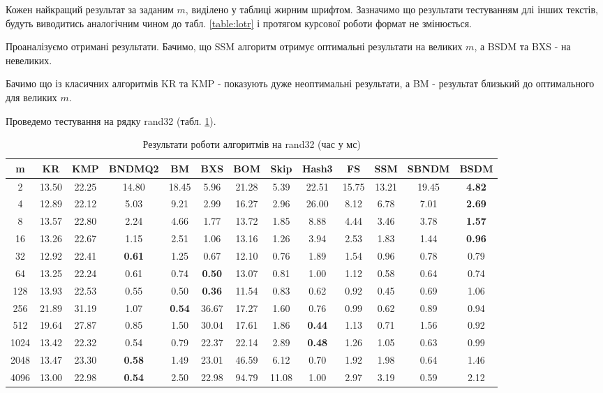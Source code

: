 \documentclass[a4paper,14pt]{extarticle} %
\begin{document}
		Кожен найкращий результат за заданим $m$, виділено у таблиці жирним шрифтом. Зазначимо що результати тестуванням длі інших текстів, будуть виводитись аналогічним чином до табл. \ref{table:lotr} і протягом курсової роботи формат не змінюється.

		Проаналізуємо отримані результати. Бачимо, що SSM алгоритм отримує оптимальні результати на великих $m$, а BSDM та BXS - на невеликих.

		Бачимо що із класичних алгоритмів KR та KMP - показують дуже неоптимальні результати, а BM - результат близький до оптимального для великих $m$.

		Проведемо тестування на рядку rand32 (табл. \ref{table:rand32}).
		\begin{table}[h]
			\centering
			\scriptsize
			\begin{tabular}{|c|c|c|c|c|c|c|c|c|c|c|c|c|}
			\hline
			\textbf{m} & \textbf{KR} & \textbf{KMP} & \textbf{BNDMQ2} & \textbf{BM} & \textbf{BXS} & \textbf{BOM} & \textbf{Skip} & \textbf{Hash3} & \textbf{FS} & \textbf{SSM} & \textbf{SBNDM} & \textbf{BSDM} \\
			\hline
			2 & 13.50 & 22.25 & 14.80 & 18.45 & 5.96 & 21.28 & 5.39 & 22.51 & 15.75 & 13.21 & 19.45 & \textbf{4.82} \\
			\hline
			4 & 12.89 & 22.12 & 5.03 & 9.21 & 2.99 & 16.27 & 2.96 & 26.00 & 8.12 & 6.78 & 7.01 & \textbf{2.69} \\
			\hline
			8 & 13.57 & 22.80 & 2.24 & 4.66 & 1.77 & 13.72 & 1.85 & 8.88 & 4.44 & 3.46 & 3.78 & \textbf{1.57} \\
			\hline
			16 & 13.26 & 22.67 & 1.15 & 2.51 & 1.06 & 13.16 & 1.26 & 3.94 & 2.53 & 1.83 & 1.44 & \textbf{0.96} \\
			\hline
			32 & 12.92 & 22.41 & \textbf{0.61} & 1.25 & 0.67 & 12.10 & 0.76 & 1.89 & 1.54 & 0.96 & 0.78 & 0.79 \\
			\hline
			64 & 13.25 & 22.24 & 0.61 & 0.74 & \textbf{0.50} & 13.07 & 0.81 & 1.00 & 1.12 & 0.58 & 0.64 & 0.74 \\
			\hline
			128 & 13.93 & 22.53 & 0.55 & 0.50 & \textbf{0.36} & 11.54 & 0.83 & 0.62 & 0.92 & 0.45 & 0.69 & 1.06 \\
			\hline
			256 & 21.89 & 31.19 & 1.07 & \textbf{0.54} & 36.67 & 17.27 & 1.60 & 0.76 & 0.99 & 0.62 & 0.89 & 0.94 \\
			\hline
			512 & 19.64 & 27.87 & 0.85 & 1.50 & 30.04 & 17.61 & 1.86 & \textbf{0.44} & 1.13 & 0.71 & 1.56 & 0.92 \\
			\hline
			1024 & 13.42 & 22.32 & 0.54 & 0.79 & 22.37 & 22.14 & 2.89 & \textbf{0.48} & 1.26 & 1.05 & 0.63 & 0.99 \\
			\hline
			2048 & 13.47 & 23.30 & \textbf{0.58} & 1.49 & 23.01 & 46.59 & 6.12 & 0.70 & 1.92 & 1.98 & 0.64 & 1.46 \\
			\hline
			4096 & 13.00 & 22.98 & \textbf{0.54} & 2.50 & 22.98 & 94.79 & 11.08 & 1.00 & 2.97 & 3.19 & 0.59 & 2.12 \\
			\hline
			\end{tabular}
			\caption{Результати роботи алгоритмів на rand32 (час у мс)}
			\label{table:rand32}
			\end{table}
\end{document}
